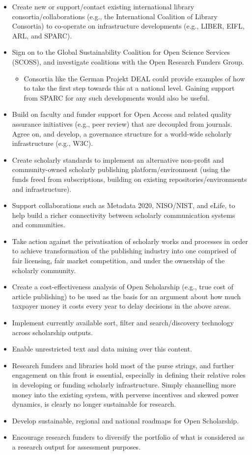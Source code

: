 \documentclass[]{article}
\providecommand{\tightlist}{%
  \setlength{\itemsep}{0pt}\setlength{\parskip}{0pt}}
\begin{document}
\begin{itemize}
\item
  Create new or support/contact existing international library
  consortia/collaborations (e.g., the International Coalition of Library
  Consortia) to co-operate on infrastructure developments (e.g., LIBER,
  EIFL, ARL, and SPARC).
\item
  Sign on to the Global Sustainability Coalition for Open Science
  Services (SCOSS), and investigate coalitions with the Open Research
  Funders Group.

  \begin{itemize}
  \tightlist
  \item
    Consortia like the German Projekt DEAL could provide examples of how
    to take the first step towards this at a national level. Gaining
    support from SPARC for any such developments would also be useful.
  \end{itemize}
\item
  Build on faculty and funder support for Open Access and related
  quality assurance initiatives (e.g., peer review) that are decoupled
  from journals. Agree on, and develop, a governance structure for a
  world-wide scholarly infrastructure (e.g., W3C).
\item
  Create scholarly standards to implement an alternative non-profit and
  community-owned scholarly publishing platform/environment (using the
  funds freed from subscriptions, building on existing
  repositories/environments and infrastructure).
\item
  Support collaborations such as Metadata 2020, NISO/NIST, and eLife, to
  help build a richer connectivity between scholarly communication
  systems and communities.
\item
  Take action against the privatisation of scholarly works and processes
  in order to achieve transformation of the publishing industry into one
  comprised of fair licensing, fair market competition, and under the
  ownership of the scholarly community.
\item
  Create a cost-effectiveness analysis of Open Scholarship (e.g., true
  cost of article publishing) to be used as the basis for an argument
  about how much taxpayer money it costs every year to delay decisions
  in the above areas.
\item
  Implement currently available sort, filter and search/discovery
  technology across scholarship outputs.
\item
  Enable unrestricted text and data mining over this content.
\item
  Research funders and libraries hold most of the purse strings, and
  further engagement on this front is essential, especially in defining
  their relative roles in developing or funding scholarly
  infrastructure. Simply channelling more money into the existing
  system, with perverse incentives and skewed power dynamics, is clearly
  no longer sustainable for research.
\item
  Develop sustainable, regional and national roadmaps for Open
  Scholarship.
\item
  Encourage research funders to diversify the portfolio of what is
  considered as a research output for assessment purposes.


\end{itemize}
\end{document}
